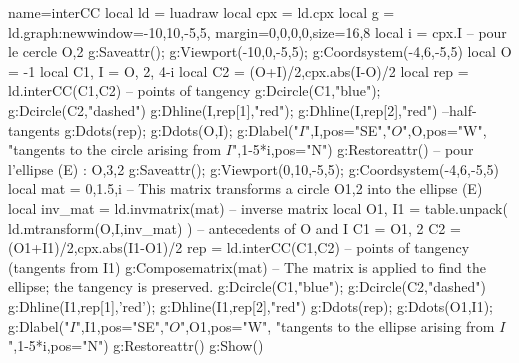 \begin{luadraw}{name=interCC}
local ld = luadraw
local cpx = ld.cpx
local g = ld.graph:new{window={-10,10,-5,5}, margin={0,0,0,0},size={16,8}}
local i = cpx.I
-- pour le cercle {O,2}
g:Saveattr(); g:Viewport(-10,0,-5,5); g:Coordsystem(-4,6,-5,5)
local O = -1
local C1, I = {O, 2}, 4-i
local C2 = {(O+I)/2,cpx.abs(I-O)/2}
local rep = ld.interCC(C1,C2) -- points of tangency
g:Dcircle(C1,"blue"); g:Dcircle(C2,"dashed")
g:Dhline(I,rep[1],"red"); g:Dhline(I,rep[2],"red") --half-tangents
g:Ddots(rep); g:Ddots({O,I}); g:Dlabel("$I$",I,{pos="SE"},"$O$",O,{pos="W"},
  "tangents to the circle arising from $I$",1-5*i,{pos="N"})
g:Restoreattr()
-- pour l'ellipse (E) : {O,3,2}
g:Saveattr(); g:Viewport(0,10,-5,5); g:Coordsystem(-4,6,-5,5)
local mat = {0,1.5,i} -- This matrix transforms a circle {O1,2} into the ellipse (E)
local inv_mat = ld.invmatrix(mat) -- inverse matrix
local O1, I1 = table.unpack( ld.mtransform({O,I},inv_mat) ) -- antecedents of O and I
C1 = {O1, 2}
C2 = {(O1+I1)/2,cpx.abs(I1-O1)/2}
rep = ld.interCC(C1,C2) -- points of tangency (tangents from I1)
g:Composematrix(mat) -- The matrix is applied to find the ellipse; the tangency is preserved.
g:Dcircle(C1,"blue"); g:Dcircle(C2,"dashed")
g:Dhline(I1,rep[1],'red'); g:Dhline(I1,rep[2],"red")
g:Ddots(rep); g:Ddots({O1,I1}); g:Dlabel("$I$",I1,{pos="SE"},"$O$",O1,{pos="W"},
  "tangents to the ellipse arising from $I$",1-5*i,{pos="N"})
g:Restoreattr()
g:Show()
\end{luadraw}
